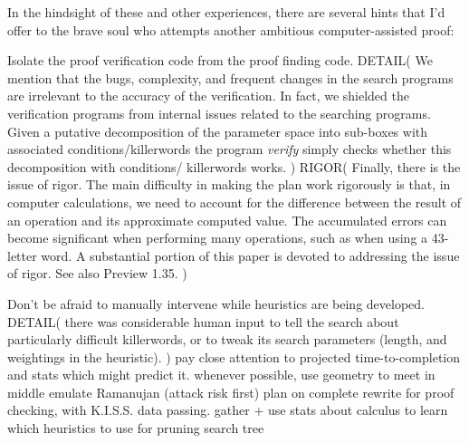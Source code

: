 \begin{itemize}
In the hindsight of these and other experiences, there are several hints that I'd offer to the brave soul who attempts another ambitious computer-assisted proof:
\begin{itemize}
   Isolate the proof verification code from the proof finding code.
DETAIL(
We mention that the bugs, complexity, and 
frequent changes in the search programs are irrelevant to the 
accuracy of the verification.  In fact, we shielded the verification 
programs from internal issues related to the searching programs.  
Given a putative decomposition of the parameter space into 
sub-boxes with associated conditions/killerwords the program {\it verify} 
simply checks whether this decomposition with conditions/ 
killerwords works. 
)
RIGOR(
Finally, there is the issue of rigor.
The main difficulty in making the plan work rigorously is that, in computer calculations, we need to account for the difference
between the result of an operation and its approximate computed value.
The accumulated errors can become significant when performing
many operations, such as when using a 43-letter 
word.  A substantial portion of this paper is devoted to addressing
the  issue of rigor.  See also Preview 1.35.
)

   Don't be afraid to manually intervene while heuristics are being developed.
DETAIL(
there was considerable human input 
to tell the search about particularly difficult killerwords, or to tweak 
its search parameters (length, and weightings in the heuristic).
)
   pay close attention to projected time-to-completion and stats which might predict it.
   whenever possible, use geometry to meet in middle
   emulate Ramanujan (attack risk first)
   plan on complete rewrite for proof checking, with K.I.S.S. data passing.
   gather + use stats about calculus to learn which heuristics to use for pruning search tree
\end{itemize}


\end{itemize}
